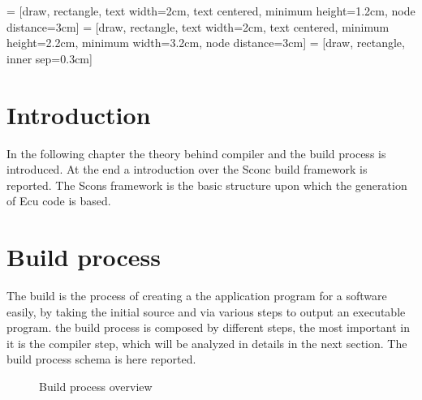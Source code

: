 \documentclass[../main.tex]{subfiles}
\begin{document}
 = [draw, rectangle, text width=2cm, text centered, minimum height=1.2cm, node distance=3cm]
 = [draw, rectangle, text width=2cm, text centered, minimum height=2.2cm, minimum width=3.2cm, node distance=3cm]
 = [draw, rectangle, inner sep=0.3cm]


\section{Introduction}
In the following chapter the theory behind compiler and the build process is introduced. At the end a introduction over the Sconc build framework is reported. The Scons framework is the basic structure upon which the generation of Ecu code is based. 
\section{Build process}
The build is the process of creating a the application program for a software easily, by taking the initial source and via various steps to output an executable program. the build process is composed by different steps, the most important in it is the compiler step, which will be analyzed in details in the next section. The build process schema is here reported.
\begin{figure}[h]
  \centering
{}
  \caption{Build process overview}
\end{figure}
\end{document}
